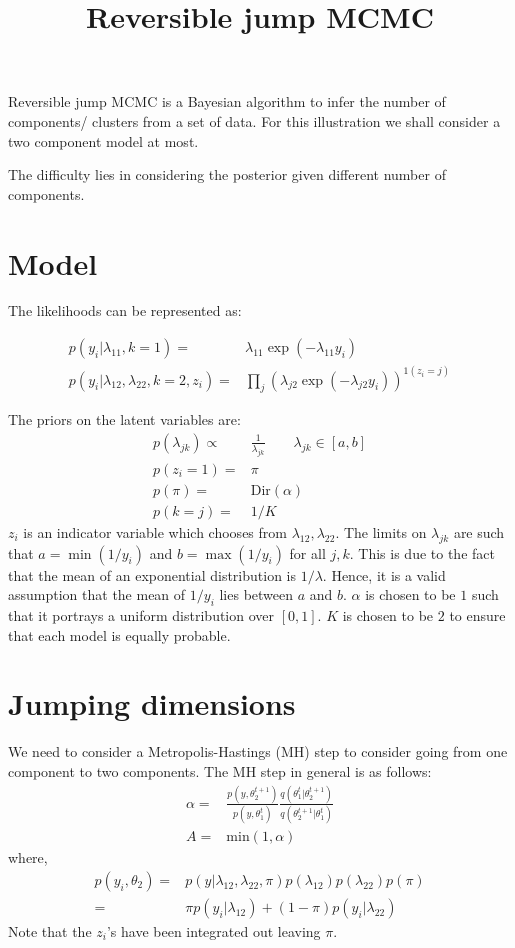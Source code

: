 \documentclass{article}
\title{Reversible jump MCMC}
\date{}
\begin{document}
\maketitle




Reversible jump MCMC is a Bayesian algorithm to infer the number of components/ clusters from a set of data. For this illustration we shall consider a two component model at most.

The difficulty lies in considering the posterior given different number of components.

\section{Model}
The likelihoods can be represented as:

\begin{align}
p(y_i|\lambda_{11},k=1)=&\lambda_{11}\exp(-\lambda_{11}y_i)\\
p(y_i|\lambda_{12},\lambda_{22},k=2,z_i)=&\prod_j (\lambda_{j2}\exp(-\lambda_{j2}y_i))^{1(z_i=j)}
\end{align}


The priors on the latent variables are:
\begin{align}
p(\lambda_{jk})\propto & \frac{1}{\lambda_{jk}}\qquad \lambda_{jk}\in[a,b]\\
p(z_i=1)=&\pi\\
p(\pi) = & \text{Dir}(\alpha)\\
p(k=j)= & 1/K
\end{align}
$z_i$ is an indicator variable which chooses from $\lambda_{12},\lambda_{22}$. The limits on $\lambda_{jk}$ are such that $a=\min(1/y_i)$ and $b=\max(1/y_i)$ for all $j,k$. This is due to the fact that the mean of an exponential distribution is $1/\lambda$. Hence, it is a valid assumption that the mean of $1/y_i$ lies between $a$ and $b$. $\alpha$ is chosen to be $1$ such that it portrays a uniform distribution over $[0,1]$. $K$ is chosen to be $2$ to ensure that each model is equally probable.

\section{Jumping dimensions}
We need to consider a Metropolis-Hastings (MH) step to consider going from one component to two components. The MH step in general is as follows:
\begin{align}
\alpha = & \frac{p(y,\theta_2^{t+1})}{p(y,\theta_1^t)}\frac{q(\theta_1^t|\theta_2^{t+1})}{q(\theta_2^{t+1}|\theta_1^{t})}\\
A = & \text{min}\left(1,\alpha\right)
\end{align}
where,
\begin{align}
p(y_i,\theta_2)=& p(y|\lambda_{12},\lambda_{22},\pi)p(\lambda_{12})p(\lambda_{22})p(\pi)\\
=&\pi p(y_i|\lambda_{12})+(1-\pi) p(y_i|\lambda_{22})
\end{align}
Note that the $z_i$'s have been integrated out leaving $\pi$.
\end{document}
